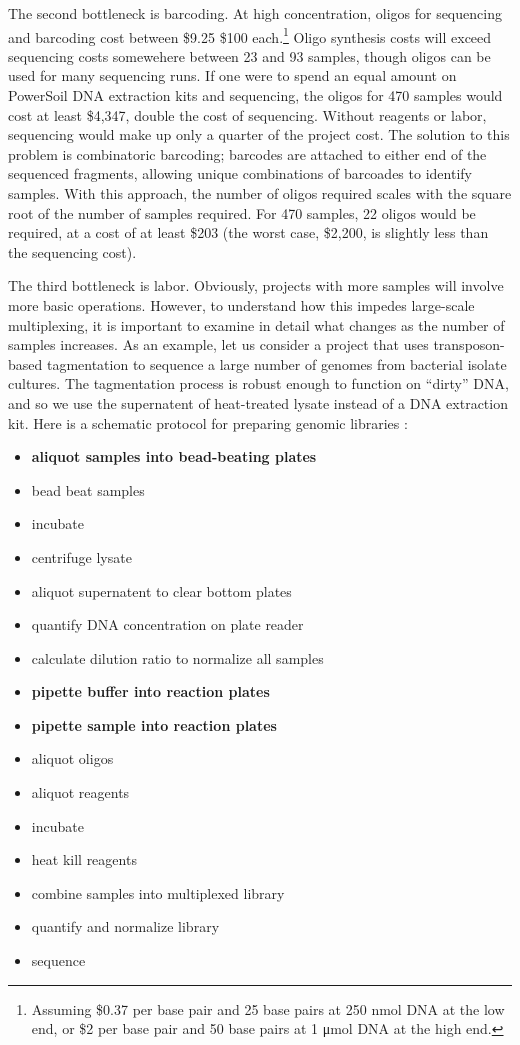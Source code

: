 \begin{refsection}
The second bottleneck is barcoding. At high concentration, oligos for sequencing and barcoding cost between \$9.25 \$100 each.\footnote{Assuming \$0.37 per base pair and 25 base pairs at 250 \si{\nano\mole} DNA at the low end, or \$2 per base pair and 50 base pairs at 1 \si{\micro\mole} DNA at the high end.} Oligo synthesis costs will exceed sequencing costs somewehere between 23 and 93 samples, though oligos can be used for many sequencing runs. If one were to spend an equal amount on PowerSoil DNA extraction kits and sequencing, the oligos for 470 samples would cost at least \$4,347, double the cost of sequencing. Without reagents or labor, sequencing would make up only a quarter of the project cost. The solution to this problem is combinatoric barcoding; barcodes are attached to either end of the sequenced fragments, allowing unique combinations of barcoades to identify samples. With this approach, the number of oligos required scales with the square root of the number of samples required. For 470 samples, 22 oligos would be required, at a cost of at least \$203 (the worst case, \$2,200, is slightly less than the sequencing cost).

The third bottleneck is labor. Obviously, projects with more samples will involve more basic operations. However, to understand how this impedes large-scale multiplexing, it is important to examine in detail what changes as the number of samples increases. As an example, let us consider a project that uses transposon-based tagmentation \cite{adey2010rapid} to sequence a large number of genomes from bacterial isolate cultures. The tagmentation process is robust enough to function on ``dirty'' DNA, and so we use the supernatent of heat-treated lysate instead of a DNA extraction kit. Here is a schematic protocol for preparing genomic libraries :

\begin{itemize}[noitemsep]
\item \textbf{aliquot samples into bead-beating plates}
\item bead beat samples
\item incubate
\item centrifuge lysate
\item aliquot supernatent to clear bottom plates
\item quantify DNA concentration on plate reader
\item calculate dilution ratio to normalize all samples
\item \textbf{pipette buffer into reaction plates}
\item \textbf{pipette sample into reaction plates}
\item aliquot oligos
\item aliquot reagents
\item incubate
\item heat kill reagents
\item combine samples into multiplexed library
\item quantify and normalize library
\item sequence
\end{itemize}


\end{refsection}
